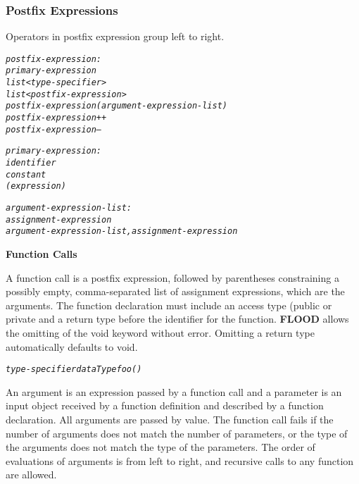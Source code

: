 \documentclass[12pt]{report}
\begin{document}
\subsubsection{Postfix Expressions}

Operators in postfix expression group left to right.

\begin{alltt}\begin{singlespace}
         \textit{postfix-expression:}
              \textit{primary-expression}
              \textit{list<type-specifier>}
              \textit{list<postfix-expression>}
              \textit{postfix-expression ( argument-expression-list )}
              \textit{postfix-expression ++}
              \textit{postfix-expression --}
              
         \textit{primary-expression:}
              \textit{identifier}
              \textit{constant}
              \textit{( expression )}
              
         \textit{argument-expression-list:}
              \textit{assignment-expression}
              \textit{argument-expression-list , assignment-expression}\end{singlespace}
\end{alltt}

\begin{flushleft}
\textbf{Function Calls}
\end{flushleft}

A function call is a postfix expression, followed by parentheses constraining a possibly empty, comma-separated list of assignment expressions, which are the arguments. The function declaration must include an access type (public or private and a return type before the identifier for the function. \textbf{FLOOD} allows the omitting of the void keyword without error. Omitting a return type automatically defaults to void.

\begin{alltt}
         \textit{type-specifier dataType foo()}
\end{alltt}

An argument is an expression passed by a function call and a parameter is an input object received by a function definition and described by a function declaration. All arguments are passed by value. The function call fails if the number of arguments does not match the number of parameters, or the type of the arguments does not match the type of the parameters. The order of evaluations of arguments is from left to right, and recursive calls to any function are allowed.
\end{document}

